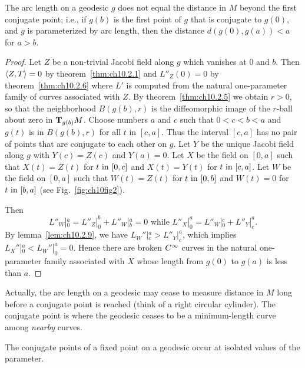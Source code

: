 \documentclass[../main]{subfiles}
\begin{document}
\begin{theorem} \label{thm:ch10.2.10}
    The arc length on a geodesic $g$ does not equal the distance in $M$ beyond the first conjugate point; i.e., if $g(b)$ is the first point of $g$ that is conjugate to $g(0)$, and $g$ is parameterized by arc length, then the distance $d(g(0),g(a))<a$ for $a>b$.
\end{theorem}

\begin{proof}
    Let $Z$ be a non-trivial Jacobi field along $g$ which vanishes at $0$ and $b$. Then $\ip{Z}{T} = 0$ by theorem~\ref{thm:ch10.2.1} and $L''_Z(0) = 0$ by theorem~\ref{thm:ch10.2.6} where $L'$ is computed from the natural one-parameter family of curves associated with $Z$. By theorem~\ref{thm:ch10.2.5} we obtain $r > 0$, so that the neighborhood $B(g(b), r)$ is the diffeomorphic image of the $r$-ball about zero in $\tangentspace{M}{g(b)}$. Choose numbers $a$ and $c$ such that $0 < c < b < a$ and $g(t)$ is in $B(g(b), r)$ for all $t$ in $[c, a]$. Thus the interval $[c, a]$ has no pair of points that are conjugate to each other on $g$. Let $Y$ be the unique Jacobi field along $g$ with $Y(c) = Z(c)$ and $Y(a) = 0$. Let $X$ be the field on $[0, a]$ such that $X(t) = Z(t)$ for $t \InText [0, c]$ and $X(t) = Y(t)$ for $t \InText [c, a]$. Let $W$ be the field on $[0, a]$ such that $W(t) = Z(t)$ for $t \InText [0, b]$ and $W(t) = 0$ for $t \InText [b, a]$ (see Fig.~\ref{fig:ch10fig2}).

    Then \[L''_W|_0^a = L''_Z|_0^b + L''_W|_b^a = 0\text{ while } L''_X|_0^a = L''_W|_0^c + L''_Y|_c^a.\] By lemma~\ref{lem:ch10.2.9}, we have $L_W''|_c^a > L''_Y|_c^a$, which implies $L_X''|_0^a < L_W''|_0^a = 0$. Hence there are broken $\CInfty$ curves in the natural one-parameter family associated with $X$ whose length from $g(0)$ to $g(a)$ is less than $a$.
\end{proof}



Actually, the arc length on a geodesic may cease to measure distance in $M$ long before a conjugate point is reached (think of a right circular cylinder). The conjugate point is where the geodesic ceases to be a minimum-length curve among \emph{nearby} curves.




\begin{theorem} \label{thm:ch10.2.11}
    The conjugate points of a fixed point on a geodesic occur at isolated values of the parameter.
\end{theorem}
\end{document}
